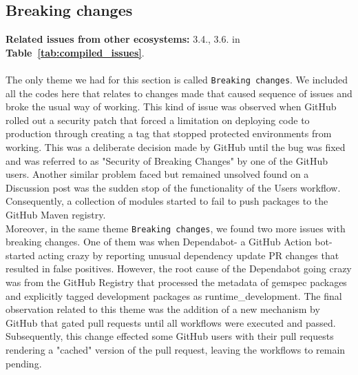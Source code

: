\documentclass[conference]{IEEEtran}
\begin{document}
\subsection*{\textbf{Breaking changes}}
\textbf{Related issues from other ecosystems:} 3.4., 3.6. in \textbf{Table~\ref{tab:compiled_issues}}.\\\\
The only theme we had for this section is called \texttt{Breaking changes}. We included all the codes here that relates to changes made that caused sequence of issues and broke the usual way of working. This kind of issue was observed when GitHub rolled out a security patch that forced a limitation on deploying code to production through creating a tag that stopped protected environments from working. This was a deliberate decision made by GitHub until the bug was fixed and was referred to as "Security of Breaking Changes" by one of the GitHub users. Another similar problem faced but remained unsolved found on a Discussion post was the sudden stop of the functionality of the Users workflow. Consequently, a collection of modules started to fail to push packages to the GitHub Maven registry.\\
	Moreover, in the same theme \texttt{Breaking changes}, we found two more issues with breaking changes. One of them was when Dependabot- a GitHub Action bot- started acting crazy by reporting unusual dependency update PR changes that resulted in false positives. However, the root cause of the Dependabot going crazy was from the GitHub Registry that processed the metadata of gemspec packages and explicitly tagged development packages as runtime\_development.  The final observation related to this theme was the addition of a new mechanism by GitHub that gated pull requests until all workflows were executed and passed.  Subsequently, this change effected some GitHub users with their pull requests rendering a "cached" version of the pull request, leaving the workflows to remain pending. 
\end{document}
